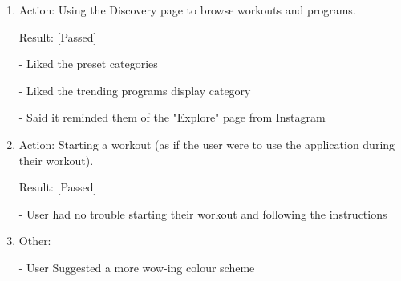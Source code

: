 \documentclass[12pt, titlepage]{article}
\begin{document}
\begin{enumerate}
	\item Action: Using the Discovery page to browse workouts and programs.
	
	Result: [Passed]
	
	-	Liked the preset categories
	
	-	Liked the trending programs display category
	
	-	Said it reminded them of the "Explore" page from Instagram
	
	
	\item Action: Starting a workout (as if the user were to use the application during their workout).
	
	Result: [Passed]
	
	-	User had no trouble starting their workout and following the instructions
	
\item Other: 

- User Suggested a more wow-ing colour scheme
\end{enumerate}
\end{document}
